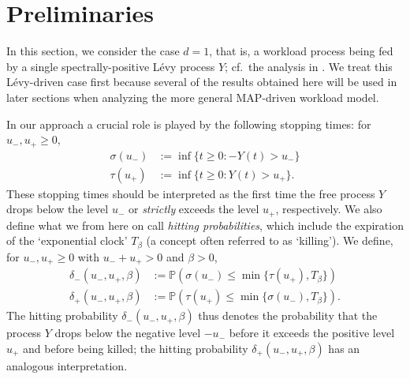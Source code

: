 \documentclass[reqno,12pt]{amsart}
\begin{document}
\section{Preliminaries}\label{sec: prelim}
In this section, we consider the case $d=1$, that is, a workload process being fed by a single spectrally-positive L\'evy process $Y$; cf.\ the analysis in \cite{PI}. We treat this L\'evy-driven case first because several of the results obtained here will be used in later sections when analyzing the more general MAP-driven workload model.

\medskip

In our approach a crucial role is played by the following stopping times: for $u_-, u_+ \geqslant 0$,
\begin{align*}
    \sigma(u_-) &:= \inf\{t \geqslant 0: -Y(t) > u_-\} \\
    \tau(u_+) &:= \inf\{t \geqslant 0: Y(t) > u_+\}.
\end{align*}
These stopping times should be interpreted as the first time the free process $Y$ drops below the level $u_-$ or \textit{strictly} exceeds the level $u_+$, respectively.
We also define what we from here on call {\it hitting probabilities}, which include the expiration of the `exponential clock' $T_\beta$ (a concept often referred to as `killing'). We define, for $u_-, u_+ \geqslant 0$ with $u_- + u_+ > 0$ and $\beta > 0$,
\begin{align*}
    \delta_{-}(u_-, u_+, \beta) &:= \mathbb{P}\left(\sigma(u_-) \leqslant \min\{\tau(u_+), T_{\beta}\}\right) \\
    \delta_{+}(u_-, u_+, \beta) &:= \mathbb{P}\left(\tau(u_+) \leqslant \min\{\sigma(u_-), T_{\beta}\}\right).
\end{align*}
The hitting probability $\delta_{-}(u_-, u_+, \beta)$ thus denotes the probability that the process $Y$ drops below the negative level $-u_-$ before it exceeds the positive level $u_+$ and before being killed; the hitting probability $\delta_{+}(u_-, u_+, \beta)$ has an analogous interpretation. 
\end{document}
